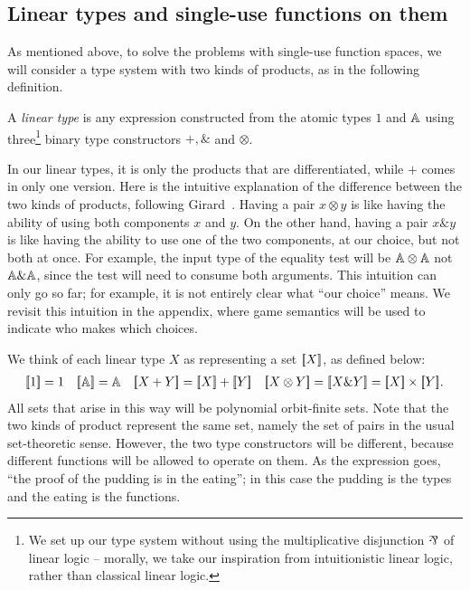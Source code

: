 \subsection{Linear types and single-use functions on them}
\label{sec:linear-types-and-single-use-functions}
As mentioned above, to solve the problems with single-use function spaces, we will consider a type system with two kinds of products, as in the following definition.
\begin{definition}\label{def:datatypes}
    A \emph{linear type} is any expression constructed from the atomic types $1$ and $\mathbb A$ using three\footnote{We set up our type system without using the multiplicative disjunction $\rotatebox[origin=c]{180}{\&}$ of linear logic -- morally, we take our inspiration from intuitionistic linear logic, rather than classical linear logic.} binary type constructors $+, \&$ and $\otimes$.
\end{definition}
In our linear types, it is only the products that are differentiated, while  $+$ comes in only one version. 
    Here is the intuitive explanation of the difference between the two kinds of products, following Girard~\cite[p.2]{girard1995advances}. Having a pair $x \otimes y$ is like having the ability of using both components $x$ and $y$. On the other hand, having a pair $x \& y$ is like having the ability to use one of the two components, at our choice, but not both at once. For example, the input type of the equality test will be $\mathbb A \otimes \mathbb A$ not $\mathbb A \& \mathbb A$, since the test will need to consume both arguments. This intuition can only go so far; for example, it is not entirely clear what ``our choice'' means. We revisit this intuition in  the appendix, where game semantics will be used to indicate who makes which choices. 



We think of each linear type $X$ as representing a set $[{\kern-0.45ex}[X]{\kern-0.45ex}]$, as defined below:
\begin{align*}
    \sem{1} = 1
\quad 
\sem{\atoms} = \atoms 
\quad 
\sem{X+Y} = \sem X + \sem Y 
\quad 
\sem{X \otimes Y} =
\sem{X \& Y} = \sem X \times \sem Y.
\end{align*}
All sets that arise in this way will be polynomial orbit-finite sets.
Note that the two kinds of product represent the same set, namely the set of pairs in the usual set-theoretic sense. 
However, the two type constructors will be  different, because different functions will be allowed to operate on them. As the expression goes, ``the proof of the pudding is in the eating''; in this case the pudding is the types and the eating is the functions.  


